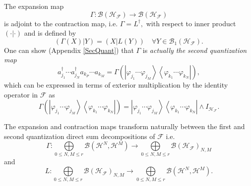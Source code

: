 \documentclass[aps,preprint,amsfonts,amssymb,showpacs,showkeys]{revtex4}%
\begin{document}
The expansion map
\begin{equation}
\Gamma:\mathcal{B}\left(  \mathcal{H}_{\mathcal{F}}\right)  \rightarrow
\mathcal{B}\left(  \mathcal{H}_{\mathcal{F}}\right)
\end{equation}
is adjoint to the contraction map, i.e. $\Gamma=L^{\dagger},$ with respect to
inner product $\left(  \cdot\left\vert \cdot\right.  \right)  $ and is defined
by
\begin{equation}
\left(  \Gamma\left(  X\right)  \left\vert Y\right.  \right)  =\left(
X\left\vert L\left(  Y\right)  \right.  \right)  \quad\forall Y\in
\mathcal{B}_{1}\left(  \mathcal{H}_{\mathcal{F}}\right)  .
\end{equation}
One can show (Appendix \ref{SecQuant}) that $\Gamma$ is \emph{actually the
second quantization map}
\begin{equation}
a_{j_{1}}^{\dagger}\cdots a_{j_{N}}^{\dagger}a_{k_{P}}\cdots a_{k_{M}}%
=\Gamma\left(  \left\vert \varphi_{j_{1}}\cdots\varphi_{j_{M}}\right\rangle
\left\langle \varphi_{k_{1}}\cdots\varphi_{k_{N}}\right\vert \right)  ,
\end{equation}
which can be expressed in terms of exterior multiplication by the identity
operator in $\mathcal{F}$ as
\begin{equation}
\Gamma\left(  \left\vert \varphi_{j_{1}}\cdots\varphi_{j_{M}}\right\rangle
\left\langle \varphi_{k_{1}}\cdots\varphi_{k_{N}}\right\vert \right)
=\left\vert \varphi_{j_{1}}\cdots\varphi_{j_{M}}\right\rangle \left\langle
\varphi_{k_{1}}\cdots\varphi_{k_{N}}\right\vert \wedge I_{\mathcal{H}%
_{\mathcal{F}}}.
\end{equation}


The expansion and contraction maps transform naturally between the first and
second quantization direct sum decompositions of $\mathcal{F}$ i.e.
\begin{equation}
\Gamma:%
{\displaystyle\bigoplus\limits_{0\leq N,M\leq r}}
\mathcal{B}\left(  \mathcal{H}^{N},\mathcal{H}^{M}\right)  \rightarrow%
{\displaystyle\bigoplus\limits_{0\leq N,M\leq r}}
\mathcal{B}\left(  \mathcal{H}_{\mathcal{F}}\right)  _{N,M}%
\end{equation}
and
\begin{equation}
L:%
{\displaystyle\bigoplus\limits_{0\leq N,M\leq r}}
\mathcal{B}\left(  \mathcal{H}_{\mathcal{F}}\right)  _{N,M}\rightarrow%
{\displaystyle\bigoplus\limits_{0\leq N,M\leq r}}
\mathcal{B}\left(  \mathcal{H}^{N},\mathcal{H}^{M}\right)  .
\end{equation}
\end{document}
